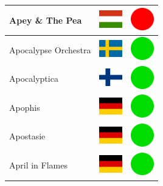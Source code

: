 \documentclass[12pt, a4paper, twoside]{report}
\begin{document}
\begin{center}
\begin{longtable}{|p{5cm}|p{2cm}|p{2cm}|}
 Apey \& The Pea                                            & \includegraphics[width=1cm]{../img/flags/hu} &   \includegraphics[width=1cm]{../likes/n} \\ \hline
 Apocalypse Orchestra                                       & \includegraphics[width=1cm]{../img/flags/se} &   \includegraphics[width=1cm]{../likes/y} \\ \hline
 Apocalyptica                                               & \includegraphics[width=1cm]{../img/flags/fi} &   \includegraphics[width=1cm]{../likes/y} \\ \hline
 Apophis                                                    & \includegraphics[width=1cm]{../img/flags/de} &   \includegraphics[width=1cm]{../likes/y} \\ \hline
 Apostasie                                                  & \includegraphics[width=1cm]{../img/flags/de} &   \includegraphics[width=1cm]{../likes/y} \\ \hline
 April in Flames                                            & \includegraphics[width=1cm]{../img/flags/de} &   \includegraphics[width=1cm]{../likes/y} \\ \hline

\end{longtable}
\end{center}
\end{document}
